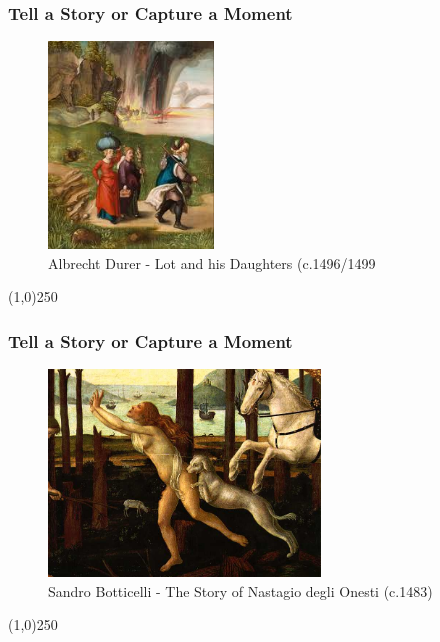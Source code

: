\begin{frame}
\frametitle{Tell a Story or Capture a Moment}
\begin{figure}
	\centering
		\includegraphics[height=5.5cm]{img/candc/DurerLotandDaughters.jpg}
	\caption{Albrecht Durer - Lot and his Daughters (c.1496/1499}
	\label{fig:DurerLotAndDaughters}
\end{figure}
\end{frame}
\begin{center}\line(1,0){250}\end{center}




\begin{frame}
\frametitle{Tell a Story or Capture a Moment}
\begin{figure}
	\centering
		\includegraphics[height=5.5cm]{img/candc/nastag12.jpg}
	\caption{Sandro Botticelli - The Story of Nastagio degli Onesti (c.1483)}
	\label{fig:BotticelliNastagio}
\end{figure}
\end{frame}
\begin{center}\line(1,0){250}\end{center}



